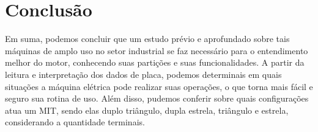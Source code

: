 \documentclass[a4paper,12pt,oneside]{article}
\begin{document}
\newpage
\section{Conclusão}\hspace{0cm}

Em suma, podemos concluir que um estudo prévio e aprofundado sobre tais máquinas de amplo uso no setor industrial se faz necessário para o entendimento melhor do motor, conhecendo suas partições e suas funcionalidades. A partir da leitura e interpretação dos dados de placa, podemos determinais em quais situações a máquina elétrica pode realizar suas operações, o que torna mais fácil e seguro sua rotina de uso. Além disso, pudemos conferir sobre quais configurações atua um MIT, sendo elas duplo triângulo, dupla estrela, triângulo e estrela, considerando a quantidade terminais. 




\newpage
{}


\end{document}
